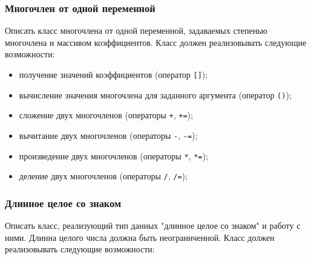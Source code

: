 \documentclass[a4paper,12pt]{article}
\begin{document}
\subsubsection{Многочлен от одной переменной}

Описать класс многочлена от одной переменной, задаваемых степенью
многочлена и массивом коэффициентов. Класс должен реализовывать
следующие возможности:

\begin{itemize}
\item получение значений коэффициентов (оператор \lstinline|[]|);
\item вычисление значения многочлена для заданного аргумента (оператор
  \lstinline|()|);
\item сложение двух многочленов (операторы \lstinline|+|,
  \lstinline|+=|);
\item вычитание двух многочленов (операторы \lstinline|-|,
  \lstinline|-=|);
\item произведение двух многочленов (операторы \lstinline|*|,
  \lstinline|*=|);
\item деление двух многочленов (операторы \lstinline|/|,
  \lstinline|/=|);
\end{itemize}

\subsubsection{Длинное целое со знаком}

Описать класс, реализующий тип данных "длинное целое со знаком" и
работу с ними. Длинна целого числа должна быть неограниченной. Класс
должен реализовывать следующие возможности:
\end{document}
